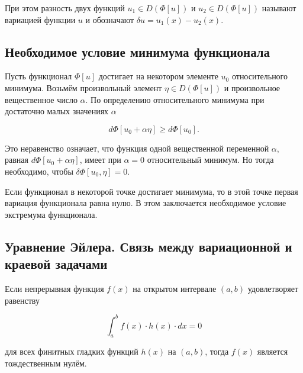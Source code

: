 \documentclass{article}
\begin{document}
\noindent При этом разность двух функций $u_{1} \in D(\Phi[u])$ и $u_{2} \in D(\Phi[u])$ называют вариацией функции $u$ и обозначают $\delta u = u_{1}(x) - u_{2}(x)$.


\subsection{Необходимое условие минимума функционала}\label{sub_section_minimum_conditions}

Пусть функционал $\Phi[u]$ достигает на некотором элементе $u_{0}$ относительного минимума. Возьмём произвольный элемент $\eta \in D(\Phi[u])$ и произвольное вещественное число $\alpha$. По определению относительного минимума при достаточно малых значениях $\alpha$

\begin{displaymath}
     d\Phi[u_{0} + \alpha\eta] \geq d\Phi[u_{0}].
\end{displaymath}

\noindent Это неравенство означает, что функция одной вещественной переменной $\alpha$, равная $d\Phi[u_{0} + \alpha\eta]$, имеет при $\alpha = 0$ относительный минимум. Но тогда необходимо, чтобы  $\delta \Phi[u_{0}, \eta] = 0$.

\begin{warn}[Важно!]
	Если функционал в некоторой точке достигает минимума, то в этой точке первая вариация функционала равна нулю. В этом заключается необходимое условие экстремума функционала.
\end{warn}


\subsection{Уравнение Эйлера. Связь между вариационной и краевой задачами}

\begin{warn}
	Если непрерывная функция $f(x)$ на открытом интервале $(a, b)$ удовлетворяет равенству
	
\begin{displaymath}
	\int_{a}^{b} f(x) \cdot h(x) \cdot dx = 0
\end{displaymath}

\noindent для всех финитных гладких функций $h(x)$ на $(a, b)$, тогда $f(x)$ является тождественным нулём.
\end{warn}
\end{document}
